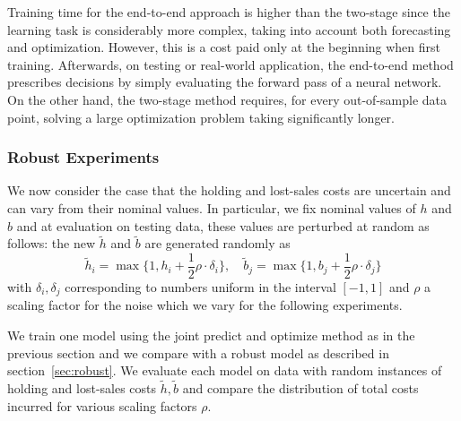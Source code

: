 \documentclass[poms,final,blindrev]{poms1_V1} %
\begin{document}
Training time for the end-to-end approach is higher than the two-stage since the learning task is considerably more complex, taking into account both forecasting and optimization. However, this is a cost paid only at the beginning when first training. Afterwards, on testing or real-world application, the end-to-end method prescribes decisions by simply evaluating the forward pass of a neural network. On the other hand, the two-stage method requires, for every out-of-sample data point, solving a large optimization problem taking significantly longer.



\subsubsection*{Robust Experiments}


We now consider the case that the holding and lost-sales costs are uncertain and can vary from their nominal values. In particular, we fix nominal values of $h$ and $b$ and at evaluation on testing data, these values are perturbed at random as follows: the new $\tilde{h}$ and $\tilde{b}$ are generated randomly as 
\begin{equation}
    \tilde{h}_i = \max\{1, h_i + \frac{1}{2} \rho \cdot \delta_i\},  \quad \tilde{b}_j = \max\{1, b_j + \frac{1}{2} \rho \cdot \delta_j\}
\end{equation}
with $\delta_i,\delta_j$ corresponding to numbers uniform in the interval $[-1,1]$ and $\rho$ a scaling factor for the noise which we vary for the following experiments.  

We train one model using the joint predict and optimize method as in the previous section and we compare with a robust model as described in section~\ref{sec:robust}. We evaluate each model on data with random instances of holding and lost-sales costs $\tilde{h}, \tilde{b}$ and compare the distribution of total costs incurred for various scaling factors $\rho$. 

\end{document}
